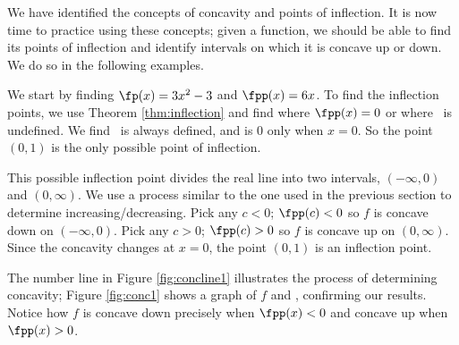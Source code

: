 We have identified the concepts of concavity and points of inflection. It is now time to practice using these concepts; given a function, we should be able to find its points of inflection and identify intervals on which it is concave up or down. We do so in the following examples.\\



{We start by finding $\fp(x)=3x^2-3$ and $\fpp(x)=6x$.  To find the inflection points, we use Theorem \ref{thm:inflection} and find where $\fpp(x)=0$ or where \fpp\ is undefined. We find \fpp\ is always defined, and is 0 only when $x=0$. So the point $(0,1)$ is the only possible point of inflection.

This possible inflection point divides the real line into two intervals, $(-\infty,0)$ and $(0,\infty)$. We use a process similar to the one used in the previous section to determine increasing/decreasing. Pick any $c<0$; $\fpp(c)<0$ so $f$ is concave down on $(-\infty,0)$. Pick any $c>0$; $\fpp(c)>0$ so $f$ is concave up on $(0,\infty)$. Since the concavity changes at $x=0$, the point $(0,1)$ is an inflection point.

The number line in Figure \ref{fig:concline1} illustrates the process of determining concavity; Figure \ref{fig:conc1} shows a graph of $f$ and \fpp, confirming our results. Notice how $f$ is concave down precisely when $\fpp(x)<0$ and concave up when $\fpp(x)>0$.
}\\


